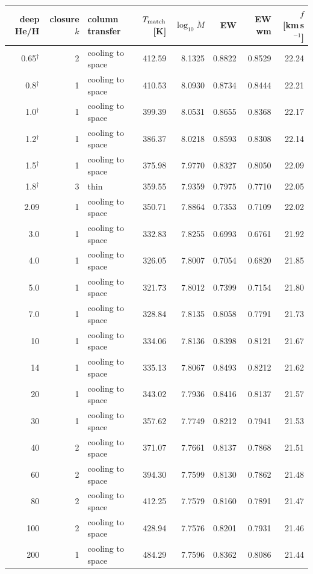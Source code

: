 \documentclass[11pt]{my_memo}
\begin{document}
\scriptsize\linespread{1.0}\selectfont\begin{longtable}{@{}r r l r r r r r@{}}
\toprule
deep He/H & closure $k$ & column transfer & $T_{\rm match}$ [K] & $\log_{10}\dot M$ & EW & EW wm & $f$ [km\,s$^{-1}$]\\
\midrule
\endhead
0.65$^{\dagger}$ & 2 & cooling to space & 412.59 & 8.1325 & 0.8822 & 0.8529 & 22.24\\
0.8$^{\dagger}$ & 1 & cooling to space & 410.53 & 8.0930 & 0.8734 & 0.8444 & 22.21\\
1.0$^{\dagger}$ & 1 & cooling to space & 399.39 & 8.0531 & 0.8655 & 0.8368 & 22.17\\
1.2$^{\dagger}$ & 1 & cooling to space & 386.37 & 8.0218 & 0.8593 & 0.8308 & 22.14\\
1.5$^{\dagger}$ & 1 & cooling to space & 375.98 & 7.9770 & 0.8327 & 0.8050 & 22.09\\
1.8$^{\dagger}$ & 3 & thin & 359.55 & 7.9359 & 0.7975 & 0.7710 & 22.05\\
2.09 & 1 & cooling to space & 350.71 & 7.8864 & 0.7353 & 0.7109 & 22.02\\
3.0 & 1 & cooling to space & 332.83 & 7.8255 & 0.6993 & 0.6761 & 21.92\\
4.0 & 1 & cooling to space & 326.05 & 7.8007 & 0.7054 & 0.6820 & 21.85\\
5.0 & 1 & cooling to space & 321.73 & 7.8012 & 0.7399 & 0.7154 & 21.80\\
7.0 & 1 & cooling to space & 328.84 & 7.8135 & 0.8058 & 0.7791 & 21.73\\
10 & 1 & cooling to space & 334.06 & 7.8136 & 0.8398 & 0.8121 & 21.67\\
14 & 1 & cooling to space & 335.13 & 7.8067 & 0.8493 & 0.8212 & 21.62\\
20 & 1 & cooling to space & 343.02 & 7.7936 & 0.8416 & 0.8137 & 21.57\\
30 & 1 & cooling to space & 357.62 & 7.7749 & 0.8212 & 0.7941 & 21.53\\
40 & 2 & cooling to space & 371.07 & 7.7661 & 0.8137 & 0.7868 & 21.51\\
60 & 2 & cooling to space & 394.30 & 7.7599 & 0.8130 & 0.7862 & 21.48\\
80 & 2 & cooling to space & 412.25 & 7.7579 & 0.8160 & 0.7891 & 21.47\\
100 & 2 & cooling to space & 428.94 & 7.7576 & 0.8201 & 0.7931 & 21.46\\
200 & 1 & cooling to space & 484.29 & 7.7596 & 0.8362 & 0.8086 & 21.44\\

\end{longtable}
\end{document}

